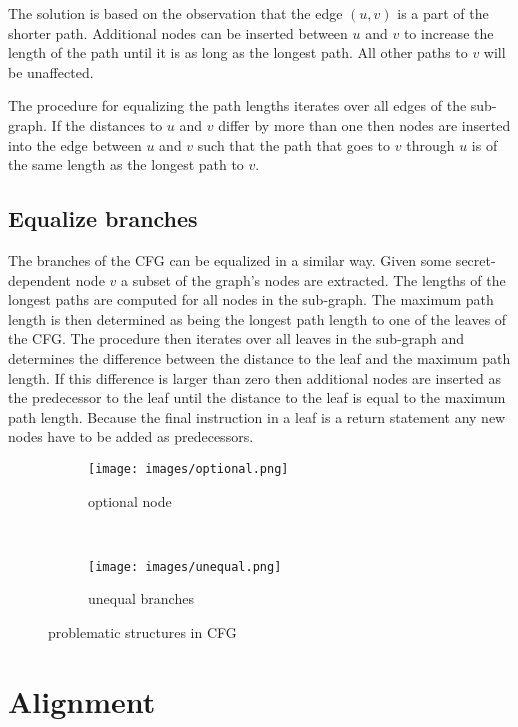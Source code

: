 The solution is based on the observation that the edge $(u, v)$ is a part of the shorter path. Additional nodes can be inserted between $u$ and $v$ to increase the length of the path until it 
is as long as the longest path. 
All other paths to $v$ will be unaffected. 

The procedure for equalizing the path lengths iterates over all edges of the sub-graph. If the distances to $u$ and $v$ differ by more than one then nodes are inserted 
into the edge between $u$ and $v$ such that the path that goes to $v$ through $u$ is of the same length as the longest path to $v$. 

\subsection{Equalize branches}
The branches of the CFG can be equalized in a similar way. Given some secret-dependent node $v$ a subset of the graph's nodes are extracted. 
The lengths of the longest paths are computed for all nodes in the sub-graph. 
The maximum path length is then determined as being the longest path length to one of the leaves of the CFG.
The procedure then iterates over all leaves in the sub-graph and determines the difference between the distance to the leaf and the maximum path length. 
If this difference is larger than zero then additional nodes are inserted as the predecessor to the leaf until the distance to the leaf is equal to the maximum 
path length. Because the final instruction in a leaf is a return statement any new nodes have to be added as predecessors. 
 
\begin{figure*}[t!]
    \centering
    \begin{subfigure}[t]{0.5\textwidth}
        \centering
        \texttt{[image: images/optional.png]}
        \caption{optional node}
        \label{fig:optional}
    \end{subfigure}%
    ~
    \begin{subfigure}[t]{0.5\textwidth}
        \centering
        \texttt{[image: images/unequal.png]}
        \caption{unequal branches}
        \label{fig:unequal}
    \end{subfigure}
    \caption{problematic structures in CFG}
    \label{fig:problemstructures}
\end{figure*}

\section{Alignment} \label{seq:alignment}

